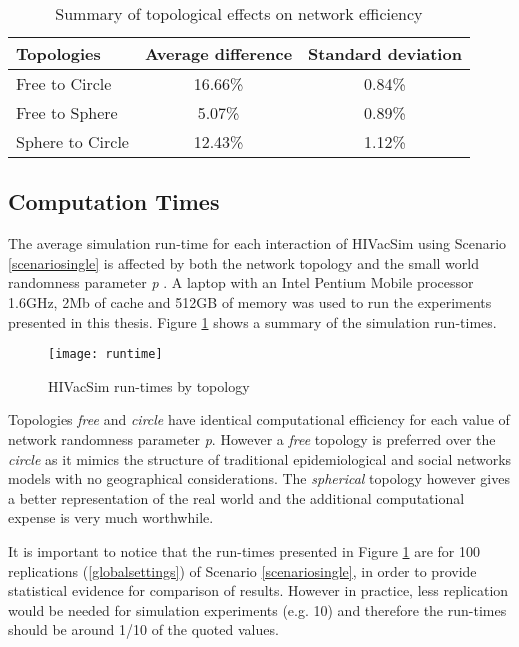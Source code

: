 \begin{longtable}[c]{|l|c|c|}
\caption{Summary of topological effects on network efficiency}\\\hline
\label{topologysummary}
\textbf{Topologies} & \textbf{Average difference} & \textbf{Standard deviation}  \\\hline
Free to Circle      & 16.66\%   &   0.84\% \\\hline
Free to Sphere      & 5.07\%    &   0.89\% \\\hline
Sphere to Circle    & 12.43\%   &   1.12\% \\\hline
\end{longtable}


\subsection{Computation Times}\label{computetime}

The average simulation run-time for each interaction of HIVacSim using Scenario
\ref{scenariosingle} is affected by both the network topology and the small world
randomness parameter \emph{p }. A laptop with an Intel Pentium Mobile processor 1.6GHz,
2Mb of cache and 512GB of memory was used to run the experiments presented in this
thesis. Figure \ref{runtime} shows a summary of the simulation run-times.
\begin{figure}[h]
\texttt{[image: runtime]}
\caption{HIVacSim run-times by topology} \label{runtime}
\end{figure}

Topologies \emph{free} and \emph{circle} have identical computational efficiency for each
value of network randomness parameter \emph{p}. However a \emph{free} topology is
preferred over the \emph{circle} as it mimics the structure of traditional
epidemiological and social networks models with no geographical considerations. The
\emph{spherical} topology however gives a better representation of the real world and the
additional computational expense is very much worthwhile.

It is important to notice that the run-times presented in Figure \ref{runtime} are for
100 replications (\ref{globalsettings}) of Scenario \ref{scenariosingle}, in order to
provide statistical evidence for comparison of results. However in practice, less
replication would be needed for simulation experiments (e.g. 10) and therefore the
run-times should be around 1/10 of the quoted values.
